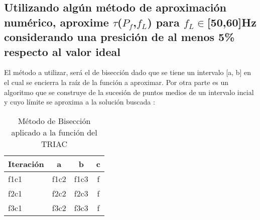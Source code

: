 \documentclass[letterpaper,10.5pt]{article} %
\begin{document}
	\subsection{Utilizando algún método de aproximación numérico, aproxime $\tau$($P_f$,$f_L$) para $f_L\in$[50,60]Hz considerando una presición de al menos 5\% respecto al valor ideal}
	El método a utilizar, será el de bisección dado que se tiene un intervalo [a, b] en el cual se encierra la raíz de la función a aproximar. Por otra parte es un algoritmo que se construye de la sucesión de puntos medios de un intervalo incial y cuyo límite se aproxima a la solución buscada \cite{agud2020metodo}:
	\begin{table}[H] %
		\centering %
		\begin{tabular}{l c r c} %
			\toprule %
			\multicolumn{1}{c}{\bfseries Iteración} &
			\multicolumn{1}{c}{\bfseries a} &
			\multicolumn{1}{c}{\bfseries b} &
			\multicolumn{1}{c}{\bfseries c} \\
			\midrule %
			f1c1 & f1c2 & f1c3 & f \\
			f2c1 & f2c2 & f2c3 & f \\
			f3c1 & f3c2 & f3c3 & f \\
			\bottomrule %
		\end{tabular}
		\caption{Método de Bisección aplicado a la función del TRIAC} %
		\label{tbl:la-tabla} %
	\end{table}

	
    
\end{document}
